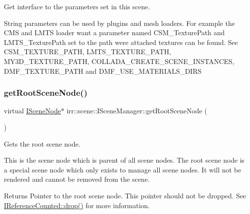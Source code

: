 Get interface to the parameters set in this scene. 

String parameters can be used by plugins and mesh loaders. For example the C\+MS and L\+M\+TS loader want a parameter named \textquotesingle{}C\+S\+M\+\_\+\+Texture\+Path\textquotesingle{} and \textquotesingle{}L\+M\+T\+S\+\_\+\+Texture\+Path\textquotesingle{} set to the path were attached textures can be found. See C\+S\+M\+\_\+\+T\+E\+X\+T\+U\+R\+E\+\_\+\+P\+A\+TH, L\+M\+T\+S\+\_\+\+T\+E\+X\+T\+U\+R\+E\+\_\+\+P\+A\+TH, M\+Y3\+D\+\_\+\+T\+E\+X\+T\+U\+R\+E\+\_\+\+P\+A\+TH, C\+O\+L\+L\+A\+D\+A\+\_\+\+C\+R\+E\+A\+T\+E\+\_\+\+S\+C\+E\+N\+E\+\_\+\+I\+N\+S\+T\+A\+N\+C\+ES, D\+M\+F\+\_\+\+T\+E\+X\+T\+U\+R\+E\+\_\+\+P\+A\+TH and D\+M\+F\+\_\+\+U\+S\+E\+\_\+\+M\+A\+T\+E\+R\+I\+A\+L\+S\+\_\+\+D\+I\+RS \mbox{\label{classirr_1_1scene_1_1ISceneManager_a4f7075320f1a3bf2838f29c23f78635f}} 
\subsubsection{\texorpdfstring{get\+Root\+Scene\+Node()}{getRootSceneNode()}}
{\footnotesize\ttfamily virtual \hyperlink{classirr_1_1scene_1_1ISceneNode}{I\+Scene\+Node}$\ast$ irr\+::scene\+::\+I\+Scene\+Manager\+::get\+Root\+Scene\+Node (\begin{DoxyParamCaption}{ }\end{DoxyParamCaption})\hspace{0.3cm}{\ttfamily [pure virtual]}}



Gets the root scene node. 

This is the scene node which is parent of all scene nodes. The root scene node is a special scene node which only exists to manage all scene nodes. It will not be rendered and cannot be removed from the scene. \begin{DoxyReturn}{Returns}
Pointer to the root scene node. This pointer should not be dropped. See \hyperlink{classirr_1_1IReferenceCounted_a03856a09355b89d178090c4a5f738543}{I\+Reference\+Counted\+::drop()} for more information. 
\end{DoxyReturn}
\mbox{\label{classirr_1_1scene_1_1ISceneManager_a433b65bfc974d069a1dc2fc296b23d9b}} 
